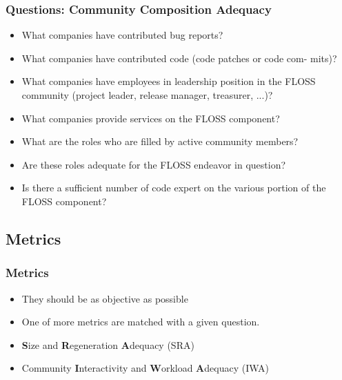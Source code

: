 \documentclass{beamer}
\begin{document}
\begin{frame}
\frametitle{Questions: Community Composition Adequacy}
\begin{center}
\begin{itemize}
\item  What companies have contributed bug reports?
\item What companies have contributed code (code patches or code com-
mits)?
\item What companies have employees in leadership position in the FLOSS
community (project leader, release manager, treasurer, ...)?
\item What companies provide services on the FLOSS component?
\item What are the roles who are filled by active community members?
\item Are these roles adequate for the FLOSS endeavor in question?
\item Is there a sufficient number of code expert on the various portion of
the FLOSS component?


\end{itemize}
\end{center}
\end{frame}


\subsection{Metrics}

\begin{frame}
\frametitle{Metrics}
\begin{center}
\begin{itemize}
\item They should be as objective as possible
\item One of more metrics are matched with a given question.
\item \textbf{S}ize and \textbf{R}egeneration \textbf{A}dequacy (SRA)
\item  Community \textbf{I}nteractivity and \textbf{W}orkload \textbf{A}dequacy (IWA)
\end{itemize}
\end{center}
\end{frame}
\end{document}
